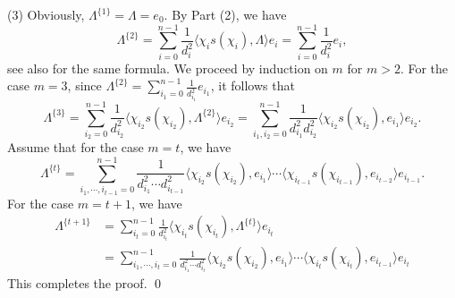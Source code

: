 \documentclass[11pt]{amsart}
\numberwithin{equation}{section}
\begin{document}
(3) Obviously, $\Lambda^{\{1\}}=\Lambda=e_0$. By Part (2), we have  $$\Lambda^{\{2\}}=\sum_{i=0}^{n-1}\frac{1}{d_i^2}\langle\chi_is(\chi_i),\Lambda\rangle e_i=\sum_{i=0}^{n-1}\frac{1}{d_i^2}e_i,$$ see also \cite[Theorem 2.8]{Cohen} for the same formula. We proceed by induction on $m$ for $m>2$. For the case $m=3$, since $\Lambda^{\{2\}}=\sum_{i_1=0}^{n-1}\frac{1}{d_{i_1}^2}e_{i_1}$, it follows that
$$
\Lambda^{\{3\}}=\sum_{i_2=0}^{n-1}\frac{1}{d_{i_2}^2}\langle\chi_{i_2}s(\chi_{i_2}),\Lambda^{\{2\}}\rangle e_{i_2}=\sum_{i_1,i_2=0}^{n-1}\frac{1}{d_{i_1}^2d_{i_2}^2}\langle\chi_{i_2}s(\chi_{i_2}),e_{i_1}\rangle e_{i_2}.
$$ Assume that for the case $m=t$, we have $$\Lambda^{\{t\}}=\sum_{i_1,\cdots,i_{t-1}=0}^{n-1}\frac{1}{d^2_{i_1}\cdots d^2_{i_{t-1}}}\langle\chi_{i_2}s(\chi_{i_2}),e_{i_1}\rangle\cdots \langle\chi_{i_{t-1}}s(\chi_{i_{t-1}}),e_{i_{t-2}}\rangle e_{i_{t-1}}.$$ For the case $m=t+1$, we have
\begin{align*}
\Lambda^{\{t+1\}}&=\sum_{i_t=0}^{n-1}\frac{1}{d_{i_t}^2}\langle\chi_{i_t}s(\chi_{i_t}),\Lambda^{\{t\}}\rangle e_{i_{t}}\\
&=\sum_{i_1,\cdots,i_{t}=0}^{n-1}\frac{1}{d^2_{i_1}\cdots d^2_{i_{t}}}\langle\chi_{i_2}s(\chi_{i_2}),e_{i_1}\rangle\cdots \langle\chi_{i_{t}}s(\chi_{i_{t}}),e_{i_{t-1}}\rangle e_{i_{t}}
\end{align*}
This completes the proof.
\qed

\end{document}
